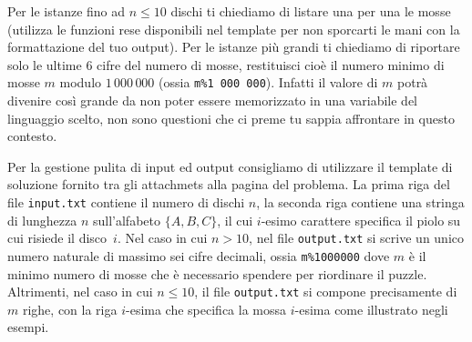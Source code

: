 Per le istanze fino ad $n\leq 10$ dischi ti chiediamo di listare una per una le mosse (utilizza le funzioni rese disponibili nel template per non sporcarti le mani con la formattazione del tuo output). Per le istanze più grandi ti chiediamo di riportare solo le ultime $6$ cifre del numero di mosse, restituisci cioè il numero minimo di mosse $m$ modulo $1\,000\,000$ (ossia {\tt m\%1\,000\,000}). Infatti il valore di $m$ potrà divenire così grande da non poter essere memorizzato in una variabile del linguaggio scelto, non sono questioni che ci preme tu sappia affrontare in questo contesto.




Per la gestione pulita di input ed output consigliamo di utilizzare il template di soluzione fornito tra gli attachmets alla pagina del problema.
La prima riga del file \verb'input.txt' contiene il numero di dischi $n$,
la seconda riga contiene una stringa di lunghezza $n$ sull'alfabeto $\{A,B,C\}$,
il cui $i$-esimo carattere specifica il piolo su cui risiede il disco~$i$.
Nel caso in cui $n>10$, nel file \verb'output.txt' si scrive un unico numero naturale di massimo sei cifre decimali, ossia {\tt m\%1000000} dove $m$ è il minimo numero di mosse che è necessario spendere per riordinare il puzzle.
Altrimenti, nel caso in cui $n\leq 10$,  il file \verb'output.txt' si compone precisamente di $m$ righe, con la riga $i$-esima  che specifica la mossa $i$-esima come illustrato negli esempi. 






